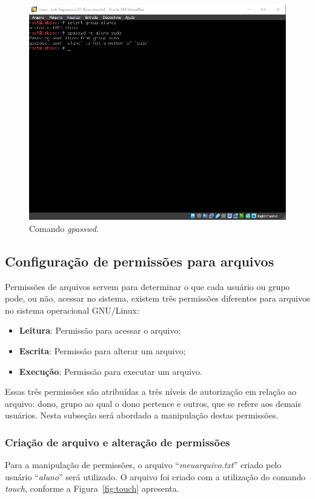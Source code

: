 \documentclass[
    12pt,				%
    oneside,   	        %
    a4paper,			%
    english,			%
    french,				%
    spanish,			%
    brazil,				%
    ]{pacotes/abntex2}
\begin{document}
\begin{figure}[H]
  \centering
  \includegraphics[scale=0.7]{figuras/gpasswd.png}
  \caption{Comando \textit{gpasswd}.}
  \label{fig:gpasswd}
\end{figure}

\subsection{Configuração de permissões para arquivos}
Permissões de arquivos servem para determinar o que cada usuário ou grupo pode, ou não, acessar no sistema, existem três permissões diferentes para arquivos no sistema operacional GNU/Linux:

\begin{itemize}
    \item \textbf{Leitura}: Permissão para acessar o arquivo;
    \item \textbf{Escrita}: Permissão para alterar um arquivo;
    \item \textbf{Execução}: Permissão para executar um arquivo.
\end{itemize}

Essas três permissões são atribuídas a três níveis de autorização em relação ao arquivo: dono, grupo ao qual o dono pertence e outros, que se refere aos demais usuários. Nesta subseção será abordado a manipulação destas permissões.

\subsubsection{Criação de arquivo e alteração de permissões}
Para a manipulação de permissões, o arquivo ``\textit{meuarquivo.txt}'' criado pelo usuário ``\textit{aluno}'' será utilizado. O arquivo foi criado com a utilização do comando \textit{touch}, conforme a Figura~\ref{fig:touch} apresenta.
\end{document}
